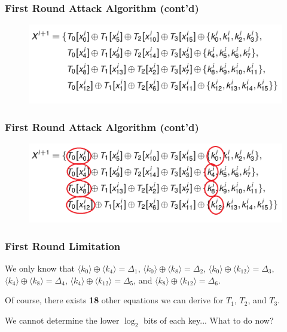 \documentclass[9pt,handout]{beamer}
\begin{document}
\begin{frame}
	\frametitle{First Round Attack Algorithm (cont'd)}
\begin{figure}
\centering
\includegraphics[scale = 0.3]{images/first.png}
\end{figure}	
	
\end{frame}

\begin{frame}
	\frametitle{First Round Attack Algorithm (cont'd)}
\begin{figure}
\centering
\includegraphics[scale = 0.3]{images/firstCircled.png}
\end{figure}	
\end{frame}

\begin{frame}
	\frametitle{First Round Limitation}
We only know that $\langle k_0 \rangle \oplus \langle k_4 \rangle = \Delta_1$, $\langle k_0 \rangle \oplus \langle k_8 \rangle = \Delta_2$,
$\langle k_0 \rangle \oplus \langle k_{12} \rangle = \Delta_3$, $\langle k_4 \rangle \oplus \langle k_8 \rangle = \Delta_4$, 
$\langle k_4 \rangle \oplus \langle k_{12} \rangle = \Delta_5$, and $\langle k_8 \rangle \oplus \langle k_{12} \rangle = \Delta_6$.

\bigskip

Of course, there exists \textbf{18} other equations we can derive for $T_1$, $T_2$, and $T_3$.

\bigskip

We cannot determine the lower $\log_2$ bits of each key... What to do now?

\end{frame}
\end{document}
